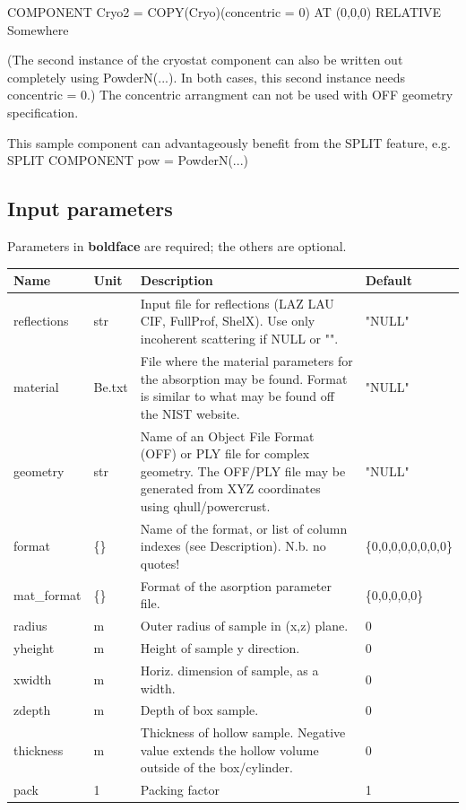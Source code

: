 COMPONENT Cryo2 = COPY(Cryo)(concentric = 0) AT (0,0,0) RELATIVE Somewhere

(The second instance of the cryostat component can also be written out completely using PowderN(...). In both cases, this second instance needs concentric = 0.) The concentric arrangment can not be used with OFF geometry specification.

This sample component can advantageously benefit from the SPLIT feature, e.g. SPLIT COMPONENT pow = PowderN(...)

\subsection*{Input parameters}
Parameters in \textbf{boldface} are required; the others are optional.

\begin{longtable}{p{}p{}p{}p{}}
\toprule
\textbf{Name} & \textbf{Unit} & \textbf{Description} & \textbf{Default} \\
\midrule
\endhead
reflections & str & Input file for reflections (LAZ LAU CIF, FullProf, ShelX). Use only incoherent scattering if NULL or "". & "NULL" \\
material & Be.txt & File where the material parameters for the absorption may be found. Format is similar to what may be found off the NIST website. & "NULL" \\
geometry & str & Name of an Object File Format (OFF) or PLY file for complex geometry. The OFF/PLY file may be generated from XYZ coordinates using qhull/powercrust. & "NULL" \\
format & \{\} & Name of the format, or list of column indexes (see Description). N.b. no quotes! & \{0,0,0,0,0,0,0,0\} \\
mat\_format & \{\} & Format of the asorption parameter file. & \{0,0,0,0,0\} \\
radius & m & Outer radius of sample in (x,z) plane. & 0 \\
yheight & m & Height of sample y direction. & 0 \\
xwidth & m & Horiz. dimension of sample, as a width. & 0 \\
zdepth & m & Depth of box sample. & 0 \\
thickness & m & Thickness of hollow sample. Negative value extends the hollow volume outside of the box/cylinder. & 0 \\
pack & 1 & Packing factor & 1 \\

\end{longtable}
